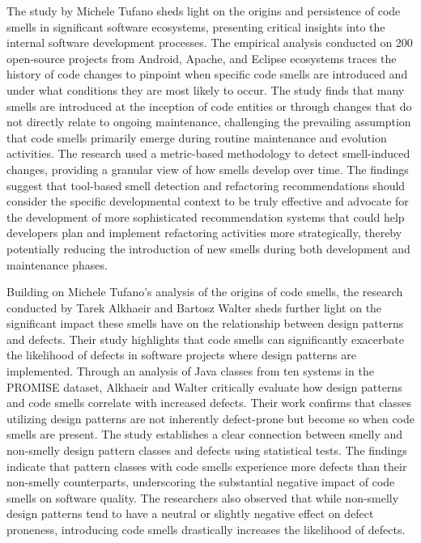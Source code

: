 The study by Michele Tufano \cite{alkhaeir2020effect} sheds light on the origins and persistence of code smells in significant software ecosystems, presenting critical insights into the internal software development processes. The empirical analysis conducted on 200 open-source projects from Android, Apache, and Eclipse ecosystems traces the history of code changes to pinpoint when specific code smells are introduced and under what conditions they are most likely to occur. The study \cite{alkhaeir2020effect} finds that many smells are introduced at the inception of code entities or through changes that do not directly relate to ongoing maintenance, challenging the prevailing assumption that code smells primarily emerge during routine maintenance and evolution activities. The research used a metric-based methodology to detect smell-induced changes, providing a granular view of how smells develop over time. The findings suggest that tool-based smell detection and refactoring recommendations should consider the specific developmental context to be truly effective and advocate for the development of more sophisticated recommendation systems that could help developers plan and implement refactoring activities more strategically, thereby potentially reducing the introduction of new smells during both development and maintenance phases.
\par
Building on Michele Tufano's analysis \cite{tufano2015and} of the origins of code smells, the research \cite{alkhaeir2020effect} conducted by Tarek Alkhaeir and Bartosz Walter sheds further light on the significant impact these smells have on the relationship between design patterns and defects. Their study \cite{alkhaeir2020effect} highlights that code smells can significantly exacerbate the likelihood of defects in software projects where design patterns are implemented. Through an analysis of Java classes from ten systems in the PROMISE dataset, Alkhaeir and Walter critically evaluate how design patterns and code smells correlate with increased defects. Their work confirms that classes utilizing design patterns are not inherently defect-prone but become so when code smells are present. The study establishes a clear connection between smelly and non-smelly design pattern classes and defects using statistical tests. The findings indicate that pattern classes with code smells experience more defects than their non-smelly counterparts, underscoring the substantial negative impact of code smells on software quality. The researchers also observed that while non-smelly design patterns tend to have a neutral or slightly negative effect on defect proneness, introducing code smells drastically increases the likelihood of defects.
